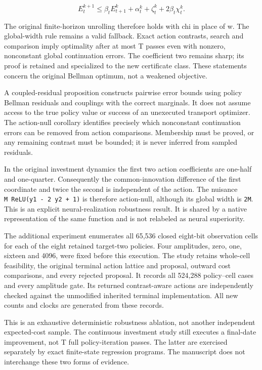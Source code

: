 \[
 E_t^{k+1}\le\beta_t E_{t+1}^k+
 \alpha_t^k+\zeta_t^k+2\beta_t\chi_t^k.
\]

The original finite-horizon unrolling therefore holds with chi in place
of w. The global-width rule remains a valid fallback. Exact action
contrasts, search and comparison imply optimality after at most T passes
even with nonzero, nonconstant global continuation errors. The
coefficient two remains sharp; its proof is retained and specialized to
the new certificate class. These statements concern the original Bellman
optimum, not a weakened objective.

A coupled-residual proposition constructs pairwise error bounds using
policy Bellman residuals and couplings with the correct marginals. It
does not assume access to the true policy value or success of an
unexecuted transport optimizer. The action-null corollary identifies
precisely which nonconstant continuation errors can be removed from
action comparisons. Membership must be proved, or any remaining contrast
must be bounded; it is never inferred from sampled residuals.

In the original investment dynamics the first two action coefficients
are one-half and one-quarter. Consequently the common-innovation
difference of the first coordinate and twice the second is independent
of the action. The nuisance \texttt{M\ ReLU(y1\ -\ 2\ y2\ +\ 1)} is
therefore action-null, although its global width is \texttt{2M}. This is
an explicit neural-realization robustness result. It is shared by a
native representation of the same function and is not relabeled as
neural superiority.

The additional experiment enumerates all 65,536 closed eight-bit
observation cells for each of the eight retained target-two policies.
Four amplitudes, zero, one, sixteen and 4096, were fixed before this
execution. The study retains whole-cell feasibility, the original
terminal action lattice and proposal, outward cost comparisons, and
every rejected proposal. It records all 524,288 policy--cell cases and
every amplitude gate. Its returned contrast-aware actions are
independently checked against the unmodified inherited terminal
implementation. All new counts and clocks are generated from these
records.

This is an exhaustive deterministic robustness ablation, not another
independent expected-cost sample. The continuous investment study still
executes a final-date improvement, not T full policy-iteration passes.
The latter are exercised separately by exact finite-state regression
programs. The manuscript does not interchange these two forms of
evidence.

